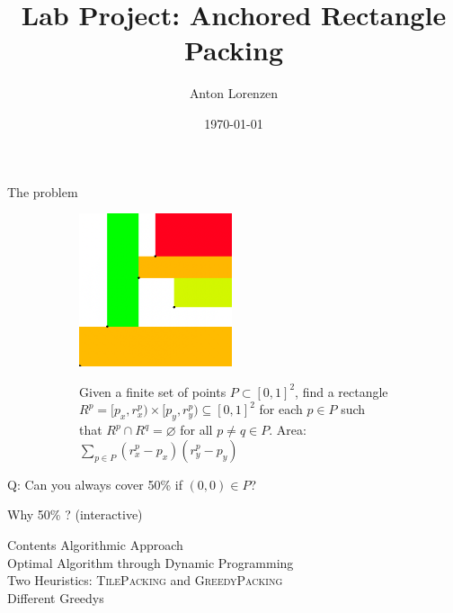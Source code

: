 \documentclass[11pt, british]{beamer}
\author{Anton Lorenzen}
\title{Lab Project: Anchored Rectangle Packing}
\date{\today}
\institute{University of Bonn}
\begin{document}
\maketitle

\begin{frame}{The problem}

  \begin{figure}
    \centering
    \begin{subfigure}{4.5cm}
      \includegraphics[width=4.5cm]{example.png}
    \end{subfigure}%
    \hspace{3mm}%
    \begin{subfigure}{5.5cm}
      \begin{definition}
        Given a finite set of points $P \subset [0,1]^2$,
        find a rectangle $R^p = [p_x, r^p_x) \times [p_y, r^p_y) \subseteq [0,1]^2$ for each $p \in P$
        such that $R^p \cap R^q = \varnothing$ for all $p \neq q \in P$.
        Area: $\sum_{p\in P} (r^p_x - p_x)(r^p_y - p_y)$
      \end{definition}
    \end{subfigure}%
  \end{figure}

  Q: Can you always cover 50\% if $(0,0) \in P$?
\end{frame}

\begin{frame}{Why 50\% ?}
  (interactive)
\end{frame}

\begin{frame}{Contents}
  Algorithmic Approach \\

  Optimal Algorithm through Dynamic Programming \\

  Two Heuristics: \textsc{TilePacking} and \textsc{GreedyPacking} \\

  Different Greedys
\end{frame}
\end{document}
